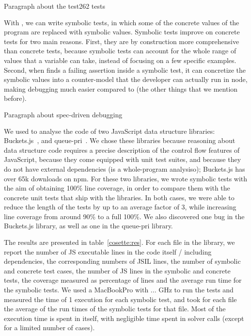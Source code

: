 
Paragraph about the test262 tests

With \cosette, we can write symbolic tests, in which some of the concrete values of the program are replaced with symbolic values.
Symbolic tests improve on concrete tests for two main reasons.
First, they are by construction more comprehensive than concrete tests, because symbolic tests can account for the whole range of values that a variable can take, instead of focusing on a few specific examples.
Second, when \cosette finds a failing assertion inside a symbolic test, it can concretize the symbolic values into a counter-model that the developer can actually run in node, making debugging much easier compared to (the other things that we mention before).

Paragraph about spec-driven debugging

We used \cosette to analyse the code of two JavaScript data structure libraries: Buckets.js~\cite{buckets}, and queue-pri~\cite{priq}.
We chose these libraries because reasoning about data structure code requires a precise description of the control flow features of JavaScript, because they come equipped with unit test suites, and because they do not have external dependencies (\cosette is a whole-program analysiso); Buckets.js has over 65k downloads on npm.
For these two libraries, we wrote symbolic tests with the aim of obtaining 100\% line coverage, in order to compare them with the concrete unit tests that ship with the libraries.
In both cases, we were able to reduce the length of the tests by up to an average factor of 3, while increasing line coverage from around 90\% to a full 100\%.
We also discovered one bug in the Buckets.js library, as well as one in the queue-pri library.


The results are presented in table~\ref{cosette:res}.
For each file in the library, we report the number of JS executable lines in the code itself / including dependencies, the corresponding numbers of JSIL lines, the number of symbolic and concrete test cases, the number of JS lines in the symbolic and concrete tests, the coverage measured as percentage of lines and the average \cosette run time for the symbolic tests.
We used a MacBookPro with ... GHz to run the tests and measured the time of 1 execution for each symbolic test, and took for each file the average of the run times of the symbolic tests for that file.
Most of the execution time is spent in \cosette itself, with negligible time spent in solver calls (except for a limited number of cases).


